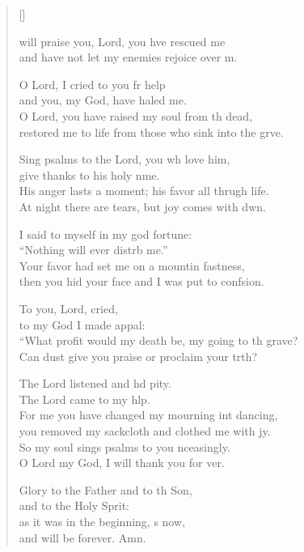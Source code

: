 \settowidth{\versewidth}{“What profit would my death be, my going to the grave? *}
\begin{verse}[\versewidth]
  \begin{patverse}
 will praise you, Lord, you hve rescued me\Med\\
and have not let my enemies rejoice over m.

O Lord, I cried to you fr help\Med\\
and you, my God, have haled me.\\
O Lord, you have raised my soul from th dead,\Med\\
restored me to life from those who sink into the grve.

Sing psalms to the Lord, you wh love him,\Med\\
give thanks to his holy nme.\\
His anger lasts a moment; his favor all thrugh life.\Med\\
At night there are tears, but joy comes with dwn.

I said to myself in my god fortune:\Med\\
“Nothing will ever distrb me.”\\
Your favor had set me on a mountin fastness,\Med\\
then you hid your face and I was put to confsion.

To you, Lord,  cried,\Med\\
to my God I made appal:\\
“What profit would my death be, my going to th grave?\Med\\
Can dust give you praise or proclaim your trth?

The Lord listened and hd pity.\Med\\
The Lord came to my hlp.\\
For me you have changed my mourning int dancing,\Med\\
you removed my sackcloth and clothed me with jy.\\
So my soul sings psalms to you nceasingly.\Med\\
O Lord my God, I will thank you for ver.

Glory to the Father and to th Son,\Med\\
and to the Holy Sp\pointup{\i}rit:\\
as it was in the beginning, \pointup{\i}s now,\Med\\
and will be forever. Amn. 
  \end{patverse}
\end{verse}
